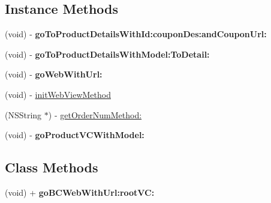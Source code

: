 \subsection*{Instance Methods}
\begin{DoxyCompactItemize}
\item 
\mbox{\label{interface_a_d_super_view_controller_afc1bdd4ec817bcaa9077cb966b412ca0}} 
(void) -\/ {\bfseries go\+To\+Product\+Details\+With\+Id\+:coupon\+Des\+:and\+Coupon\+Url\+:}
\item 
\mbox{\label{interface_a_d_super_view_controller_a8f60cd224080032c90ca2ef1cfc09dd9}} 
(void) -\/ {\bfseries go\+To\+Product\+Details\+With\+Model\+:\+To\+Detail\+:}
\item 
\mbox{\label{interface_a_d_super_view_controller_ac291dea5c859ebbcebe201a6a6b740d7}} 
(void) -\/ {\bfseries go\+Web\+With\+Url\+:}
\item 
(void) -\/ \mbox{\hyperlink{interface_a_d_super_view_controller_a3c8ad0c74f7158670ff46e3b4e4f54cc}{init\+Web\+View\+Method}}
\item 
(N\+S\+String $\ast$) -\/ \mbox{\hyperlink{interface_a_d_super_view_controller_aa68e297b4c4dc76a063dd558592598f3}{get\+Order\+Num\+Method\+:}}
\item 
\mbox{\label{interface_a_d_super_view_controller_a03e901087ba192b9b93b58606105361f}} 
(void) -\/ {\bfseries go\+Product\+V\+C\+With\+Model\+:}
\end{DoxyCompactItemize}
\subsection*{Class Methods}
\begin{DoxyCompactItemize}
\item 
\mbox{\label{interface_a_d_super_view_controller_ade6307226a4918219d61235dda575f3f}} 
(void) + {\bfseries go\+B\+C\+Web\+With\+Url\+:root\+V\+C\+:}
\end{DoxyCompactItemize}
